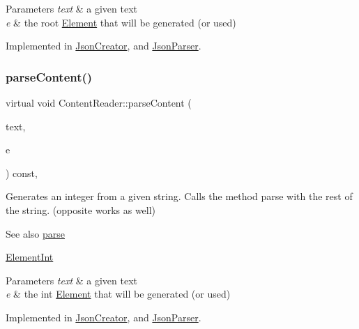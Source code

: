 \begin{DoxyParams}{Parameters}
{\em text} & a given text \\
\hline
{\em e} & the root \mbox{\hyperlink{classElement}{Element}} that will be generated (or used) \\
\hline
\end{DoxyParams}


Implemented in \mbox{\hyperlink{classJsonCreator_a505ff309c6b144d29478804b0e187c6f}{Json\+Creator}}, and \mbox{\hyperlink{classJsonParser_a3ec3a9fcc8a63f987b4749d60b0568df}{Json\+Parser}}.

\mbox{\label{classContentReader_a7eef37b8b9761e21c0a3907ff94c72f7}} 
\subsubsection{\texorpdfstring{parse\+Content()}{parseContent()}\hspace{0.1cm}{\footnotesize\ttfamily [1/6]}}
{\footnotesize\ttfamily virtual void Content\+Reader\+::parse\+Content (\begin{DoxyParamCaption}\item[{std\+::string \&}]{text,  }\item[{\mbox{\hyperlink{classElementInt}{Element\+Int}} $\ast$}]{e }\end{DoxyParamCaption}) const\hspace{0.3cm}{\ttfamily [pure virtual]}, {\ttfamily [inherited]}}

Generates an integer from a given string. Calls the method parse with the rest of the string. (opposite works as well) \begin{DoxySeeAlso}{See also}
\mbox{\hyperlink{classContentReader_a7fff2e63a2e8fa216665604f69974e1d}{parse}} 

\mbox{\hyperlink{classElementInt}{Element\+Int}}
\end{DoxySeeAlso}

\begin{DoxyParams}{Parameters}
{\em text} & a given text \\
\hline
{\em e} & the int \mbox{\hyperlink{classElement}{Element}} that will be generated (or used) \\
\hline
\end{DoxyParams}


Implemented in \mbox{\hyperlink{classJsonCreator_a0fe34794ee3563c3e0bc35006129fcdc}{Json\+Creator}}, and \mbox{\hyperlink{classJsonParser_ac80cf84ff2565f4c1f3a0f5ddb559c96}{Json\+Parser}}.

